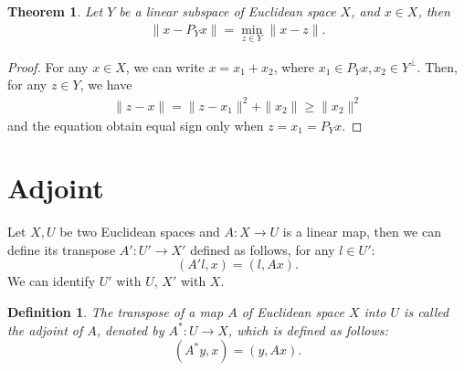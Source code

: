 \documentclass[11pt]{book}
\newtheorem{definition}{Definition}[section]
\newtheorem{theorem}{Theorem}[section]
\theoremstyle{definition}
\numberwithin{equation}{subsection}
\begin{document}
\medskip

\begin{theorem}
Let $Y$ be a linear subspace of Euclidean space $X$, and $x\in X$, then 
\begin{align*}
    \|x - P_Y x\| = \min_{z\in Y} \|x - z\|.
\end{align*}
\end{theorem}
\begin{proof}
For any $x\in X$, we can write $x = x_1 + x_2$, where $x_1\in P_Y x, x_2\in Y^\perp$. Then, for any $z\in Y$, we have
\begin{align*}
    \|z - x\| = \|z - x_1\|^2 + \|x_2\| \geq \|x_2\|^2
\end{align*}
and the equation obtain equal sign only when $z = x_1 = P_Y x$.
\end{proof}

\medskip

\section{Adjoint}

Let $X,U$ be two Euclidean spaces and $A:X\to U$ is a linear map, then we can define its transpose $A':U'\to X'$ defined as follows, for any $l\in U'$:
$$(A' l, x) = (l, Ax).$$
We can identify $U'$ with $U$, $X'$ with $X$.

\begin{definition}
The transpose of a map $A$ of Euclidean space $X$ into $U$ is called the adjoint of $A$, denoted by $A^*:U\to X$, which is defined as follows:
$$(A^* y, x) = (y, Ax).$$
\end{definition}

\medskip
\end{document}
